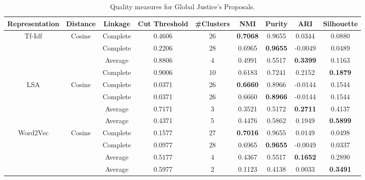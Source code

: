 
\begin{table}[!htpb]
\centering
{\scriptsize %
\begin{tabular}{c|c|c|c|c|c|c|c|c}
 \hline
Representation & Distance & Linkage & Cut Threshold & \#Clusters & NMI & Purity & ARI & Silhouette\\
\hline
\hline
\multirow{4}{*}{Tf-Idf}  & \multirow{4}{*}{Cosine}  & Complete & 0.4606 & 26 & \textbf{0.7068} & 0.9655 & 0.0344 & 0.0880 \\
 & & Complete & 0.2206 & 28 & 0.6965 & \textbf{0.9655}&  -0.0049 & 0.0489 \\
 & & Average & 0.8806 & 4 & 0.4991 &  0.5517 & \textbf{0.3399} & 0.1163  \\
 & & Complete & 0.9006 & 10 & 0.6183 &  0.7241 & 0.2152 & \textbf{0.1879} \\
\cline{1-9}
\multirow{4}{*}{LSA}  & \multirow{4}{*}{Cosine}  & Complete & 0.0371 & 26 & \textbf{0.6660} & 0.8966 & -0.0144 & 0.1544 \\
 & & Complete & 0.0371 & 26 & 0.6660 & \textbf{0.8966}&  -0.0144 & 0.1544 \\
 & & Average & 0.7171 & 3 & 0.3521 &  0.5172 & \textbf{0.2711} & 0.4137  \\
 & & Average & 0.4371 & 5 & 0.4476 &  0.5862 & 0.1949 & \textbf{0.5899} \\
\cline{1-9}
\multirow{4}{*}{Word2Vec}  & \multirow{4}{*}{Cosine}  & Complete & 0.1577 & 27 & \textbf{0.7016} & 0.9655 & 0.0149 & 0.0498 \\
 & & Complete & 0.0977 & 28 & 0.6965 & \textbf{0.9655}&  -0.0049 & 0.0337 \\
 & & Average & 0.5177 & 4 & 0.4367 &  0.5517 & \textbf{0.1652} & 0.2890  \\
 & & Average & 0.5977 & 2 & 0.1123 &  0.4138 & 0.0033 & \textbf{0.3491} \\
\cline{1-9}
\hline
\end{tabular}
}%
\caption{Quality measures for Global Justice's Proposals.}
\label{tab:negative.scores}
\end{table}